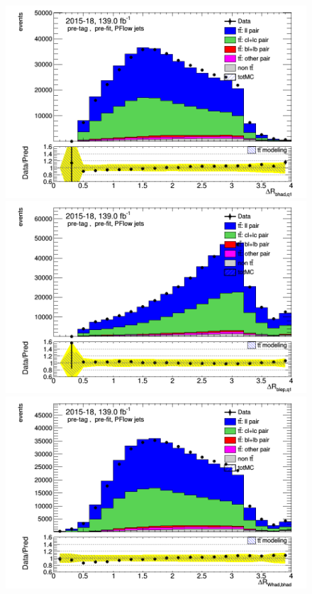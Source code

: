 \documentclass[letterpaper,12pt]{article}
\begin{document}
\begin{figure}
\begin{minipage}[b]{.45\textwidth}
\centering
\includegraphics[width=1\textwidth]{Oct_distributions/pretagNoRwDL1rwithhighpTPFlow_scaledall/DataMC_dRbhadq1.png}
\end{minipage}\hfill
\begin{minipage}[b]{.45\textwidth}
\centering
\includegraphics[width=1\textwidth]{Oct_distributions/pretagNoRwDL1rwithhighpTPFlow_scaledall/DataMC_dRblepq1.png} 
\end{minipage}\hfill
\begin{minipage}[b]{.45\textwidth}
\centering
\includegraphics[width=1\textwidth]{Oct_distributions/pretagNoRwDL1rwithhighpTPFlow_scaledall/DataMC_dRWhadbhad.png} 

\end{minipage}
\end{figure}
\end{document}
